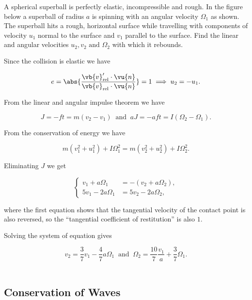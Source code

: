{A spherical superball is perfectly elastic, incompressible and rough. In the figure below a superball of radius \(a\) is spinning with an angular velocity \(\Omega _{1} \) as shown. The superball hits a rough, horizontal surface while travelling with components of velocity \(u_1 \) normal to the surface and \(v_1 \) parallel to the surface. Find the linear and angular velocities \(u_2 , v_2 \text { and } \Omega _{2} \) with which it rebounds.}
{Since the collision is elastic we have 

\begin{equation}
	e = \abs{\frac{\vb{v} _{\text{rel} } ' \cdot \vu{n} }{\vb{v} _{\text{rel} } \cdot \vu{n}  } } = 1 \implies u_2 = -u_1 . 
\end{equation}

From the linear and angular impulse theorem we have 

\begin{equation}
	J = -ft = m(v_2 -v_1 ) ~\text { and }~ aJ = -aft = I(\Omega _{2} - \Omega _{1}  ).
\end{equation}

From the conservation of energy we have 

\begin{equation}
	m(v_1 ^2+u_1 ^2) + I\Omega _{1}^2 = m(v_2 ^2+u_2 ^2) + I\Omega _{2}^2.  
\end{equation}

Eliminating \(J\) we get 

\begin{equation}
	\begin{cases}
		v_1 +a\Omega _{1} &= -(v_2 +a\Omega _{2} ) ,\\
		5v_1 -2a\Omega _{1} &= 5v_2 -2a\Omega _{2}  ,
	\end{cases}
\end{equation}

where the first equation shows that the tangential velocity of the contact point is also reversed, so the ``tangential coefficient of restitution'' is also \(1\).

Solving the system of equation gives 

\begin{equation}
	v_2 =\frac{3}{7} v_1 -\frac{4}{7} a \Omega _{1} ~\text { and }~ \Omega _{2} = \frac{10}{7} \frac{v_1 }{a} + \frac{3}{7} \Omega _{1} .   
\end{equation}
~
} 

\subsection{Conservation of Waves}

